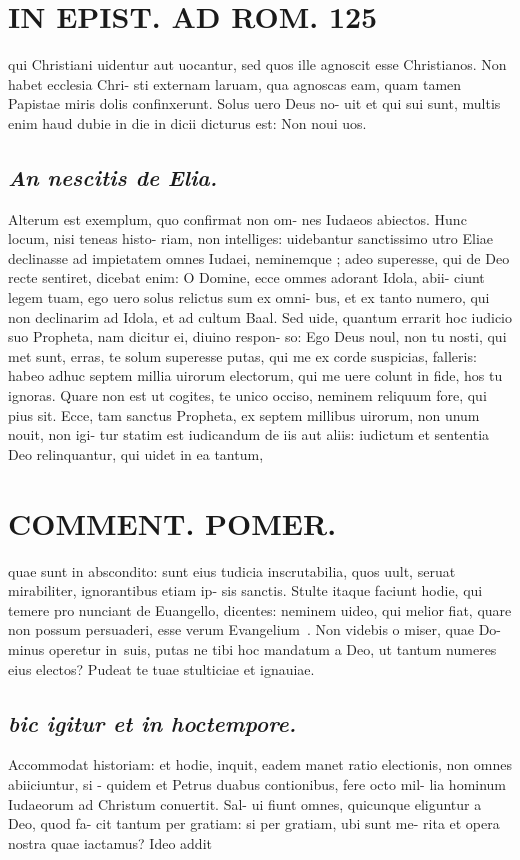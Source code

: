 \documentclass{article}
\begin{document}
\begin{pages}
\section*{IN EPIST. AD ROM.  125 }
\marginpar{[ p.]}\pstart qui Christiani uidentur aut uocantur, sed quos ille agnoscit esse Christianos. Non habet ecclesia Chri- sti externam laruam, qua agnoscas eam, quam tamen Papistae miris dolis confinxerunt. Solus uero Deus no- uit et qui sui sunt, multis enim haud dubie in die in dicii dicturus est: Non noui uos.  \pend
{}
{}
\subsection*{\textit{An nescitis de Elia. }}\pstart Alterum est exemplum, quo confirmat non om- nes Iudaeos abiectos. Hunc locum, nisi teneas histo- riam, non intelliges: uidebantur sanctissimo utro Eliae declinasse ad impietatem omnes Iudaei, neminemque ; adeo superesse, qui de Deo recte sentiret, dicebat enim: O Domine, ecce ommes adorant Idola, abii- ciunt legem tuam, ego uero solus relictus sum ex omni- bus, et ex tanto numero, qui non declinarim ad Idola, et ad cultum Baal. Sed uide, quantum errarit hoc iudicio suo Propheta, nam dicitur ei, diuino respon- so: Ego Deus noul, non tu nosti, qui met sunt, erras, te solum superesse putas, qui me ex corde suspicias, falleris: habeo adhuc septem millia uirorum electorum, qui me uere colunt in fide, hos tu ignoras. Quare non est ut cogites, te unico occiso, neminem reliquum fore, qui pius sit. Ecce, tam sanctus Propheta, ex septem millibus uirorum, non unum nouit, non igi- tur statim est iudicandum de iis aut aliis: iudictum et sententia Deo relinquantur, qui uidet in ea tantum,  \pend
\section*{COMMENT. POMER.  }\pstart quae sunt in abscondito: sunt eius tudicia inscrutabilia, quos uult, seruat mirabiliter, ignorantibus etiam ip- sis sanctis. Stulte itaque faciunt hodie, qui temere pro nunciant de Euangello, dicentes: neminem uideo, qui melior fiat, quare non possum persuaderi, esse verum Evangelium . Non videbis o miser, quae Do- minus operetur in suis, putas ne tibi hoc mandatum a Deo, ut tantum numeres eius electos? Pudeat te tuae stulticiae et ignauiae.  \pend
{}
{}
\subsection*{\textit{bic igitur et in hoctempore. }}\pstart Accommodat historiam: et hodie, inquit, eadem manet ratio electionis, non omnes abiiciuntur, si - quidem et Petrus duabus contionibus, fere octo mil- lia hominum Iudaeorum ad Christum conuertit. Sal- ui fiunt omnes, quicunque eliguntur a Deo, quod fa- cit tantum per gratiam: si per gratiam, ubi sunt me- rita et opera nostra quae iactamus? Ideo addit  \pend
{}
{}

\end{pages}
\end{document}

